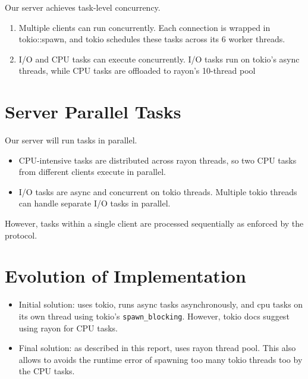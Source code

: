 \documentclass[11pt]{article}
\begin{document}
Our server achieves task-level concurrency.
\begin{enumerate}
    \item Multiple clients can run concurrently. Each connection is wrapped in tokio::spawn, and tokio schedules these tasks across its 6 worker threads.
    \item I/O and CPU tasks can execute concurrently. I/O tasks run on tokio's async threads, while CPU tasks are offloaded to rayon's 10-thread pool
\end{enumerate}

\section{Server Parallel Tasks}

Our server will run tasks in parallel.
\begin{itemize}
    \item CPU-intensive tasks are distributed across rayon threads, so two CPU tasks from different clients execute in parallel.
    \item I/O tasks are async and concurrent on tokio threads. Multiple tokio threads can handle separate I/O tasks in parallel.
\end{itemize}
However, tasks within a single client are processed sequentially as enforced by the protocol.

\section{Evolution of Implementation}
\begin{itemize}
    \item Initial solution: uses tokio, runs async tasks asynchronously, and cpu tasks on its own
        thread using tokio's \texttt{spawn\_blocking}. However, tokio docs suggest using rayon for CPU tasks.
    \item Final solution: as described in this report, uses rayon thread pool. This also allows to avoids the runtime error of spawning too many tokio threads too by the CPU tasks.
\end{itemize}
\end{document}
